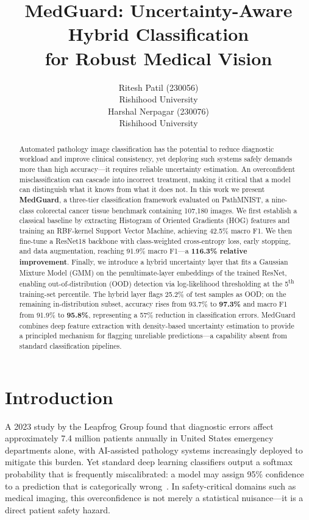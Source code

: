 \documentclass{article}
\title{MedGuard: Uncertainty-Aware Hybrid Classification\\for Robust Medical Vision}
\author{
  Ritesh Patil (230056) \\
  Rishihood University \\
  \And
  Harshal Nerpagar (230076) \\
  Rishihood University \\
}
\begin{document}
\maketitle

\begin{abstract}
Automated pathology image classification has the potential to reduce diagnostic workload and improve clinical consistency, yet deploying such systems safely demands more than high accuracy---it requires reliable uncertainty estimation. An overconfident misclassification can cascade into incorrect treatment, making it critical that a model can distinguish what it knows from what it does not. In this work we present \textbf{MedGuard}, a three-tier classification framework evaluated on PathMNIST, a nine-class colorectal cancer tissue benchmark containing 107,180 images. We first establish a classical baseline by extracting Histogram of Oriented Gradients (HOG) features and training an RBF-kernel Support Vector Machine, achieving 42.5\% macro F1. We then fine-tune a ResNet18 backbone with class-weighted cross-entropy loss, early stopping, and data augmentation, reaching 91.9\% macro F1---a \textbf{116.3\% relative improvement}. Finally, we introduce a hybrid uncertainty layer that fits a Gaussian Mixture Model (GMM) on the penultimate-layer embeddings of the trained ResNet, enabling out-of-distribution (OOD) detection via log-likelihood thresholding at the 5\textsuperscript{th} training-set percentile. The hybrid layer flags 25.2\% of test samples as OOD; on the remaining in-distribution subset, accuracy rises from 93.7\% to \textbf{97.3\%} and macro F1 from 91.9\% to \textbf{95.8\%}, representing a 57\% reduction in classification errors. MedGuard combines deep feature extraction with density-based uncertainty estimation to provide a principled mechanism for flagging unreliable predictions---a capability absent from standard classification pipelines.
\end{abstract}

\section{Introduction}
\label{sec:intro}

A 2023 study by the Leapfrog Group found that diagnostic errors affect approximately 7.4 million patients annually in United States emergency departments alone, with AI-assisted pathology systems increasingly deployed to mitigate this burden. Yet standard deep learning classifiers output a softmax probability that is frequently miscalibrated: a model may assign 95\% confidence to a prediction that is categorically wrong~\citep{gal2016dropout}. In safety-critical domains such as medical imaging, this overconfidence is not merely a statistical nuisance---it is a direct patient safety hazard.
\end{document}
